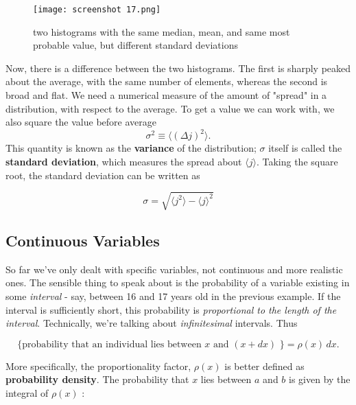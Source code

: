 \documentclass[svgnames]{article}   	%
\begin{document}
\begin{figure}[htb!]
  \centering
    \texttt{[image: screenshot 17.png]}
    \caption{two histograms with the same median, mean, and same most probable
    value, but different standard deviations}
\end{figure}

\vspace{5px}

Now, there is a difference between the two histograms. The first is sharply
peaked about the average, with the same number of elements, whereas the second
is broad and flat. We need a numerical measure of the amount of "spread" in
a distribution, with respect to the average. To get a value we can work with,
we also square the value before average
\vspace{5px} \[
\sigma^2 \equiv \langle (\Delta j)^2 \rangle.
\] \vspace{5px}
This quantity is known as the \textbf{variance} of the distribution; $\sigma$
itself is called the \textbf{standard deviation}, which measures the spread
about $\langle j \rangle$. Taking the square root, the standard deviation can
be written as 

\vspace{5px} \[
\sigma = \sqrt{\langle j^2\rangle - \langle j \rangle ^2}  
\] \vspace{5px}

\subsection{Continuous Variables}

So far we've only dealt with specific variables, not continuous and more
realistic ones. The sensible thing to speak about is the probability of
a variable existing in some \textit{interval} - say, between 16 and 17 years
old in the previous example. If the interval is sufficiently short, this
probability is \textit{proportional to the length of the interval}.
Technically, we're talking about \textit{infinitesimal} intervals. Thus

\vspace{5px} \[
  \{ \text{probability that an individual lies between $x$ and  $(x + dx)$ \}}
    = \rho(x) \,dx . 
\] \vspace{5px}


More specifically, the proportionality factor, $\rho(x)$ is better defined as
\textbf{probability density}. The probability that $x$ lies between $a$ and $b$
is given by the integral of $\rho(x)$ : 
\end{document}

